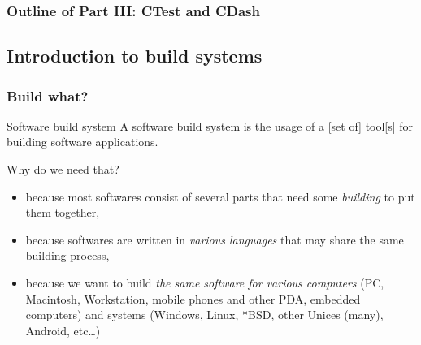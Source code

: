 \documentclass[compress,slidestop,table
              ]
               {beamer}
\begin{document}
\begin{frame}
\frametitle{Outline of Part III: CTest and CDash}
\tableofcontents[part=3]
\end{frame}

\subsection*{Introduction to build systems}
\begin{frame}
\frametitle{Build what?}
\begin{block}{Software build system}
A software build system is the usage of a [set of] tool[s] for building software applications.
\end{block}
\begin{block}{Why do we need that?}
\begin{itemize}
\pause
\item because most softwares consist of several parts that need
      some \emph{building} to put them together,
\pause
\item because softwares are written in \emph{various languages} 
      that may share the same building process,
\pause
\item because we want to build \emph{the same software for various computers} {\scriptsize (PC, Macintosh, Workstation, mobile phones and other PDA, embedded computers) and systems (Windows, Linux, *BSD, other Unices (many), Android, etc\ldots)}
\end{itemize}
\end{block}
\end{frame}
\end{document}
